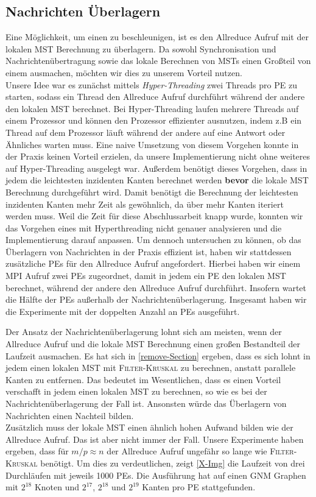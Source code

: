 \subsection{Nachrichten Überlagern}
Eine Möglichkeit, um einen \boruvkaStep zu beschleunigen, ist es den Allreduce Aufruf mit der lokalen MST Berechnung zu überlagern. Da sowohl Synchronisation und Nachrichtenübertragung sowie das lokale Berechnen von MSTs einen Großteil von einem \boruvkaStep ausmachen, möchten wir dies zu unserem Vorteil nutzen.\\
Unsere Idee war es zunächst mittels \emph{Hyper-Threading} zwei Threads pro PE zu starten, sodass ein Thread den Allreduce Aufruf durchführt während der andere den lokalen MST berechnet. Bei Hyper-Threading laufen mehrere Threads auf einem Prozessor und können den Prozessor effizienter ausnutzen, indem z.B ein Thread auf dem Prozessor läuft während der andere auf eine Antwort oder Ähnliches warten muss.
Eine naive Umsetzung von diesem Vorgehen konnte in der Praxis keinen Vorteil erzielen, da unsere Implementierung nicht ohne weiteres auf Hyper-Threading ausgelegt war. Außerdem benötigt dieses Vorgehen, dass in jedem \boruvkaStep die leichtesten inzidenten Kanten berechnet werden \textbf{bevor} die lokale MST Berechnung durchgeführt wird. Damit benötigt die Berechnung der leichtesten inzidenten Kanten mehr Zeit als gewöhnlich, da über mehr Kanten iteriert werden muss.
Weil die Zeit für diese Abschlussarbeit knapp wurde, konnten wir das Vorgehen eines \boruvkaStep mit Hyperthreading nicht genauer  analysieren und die Implementierung darauf anpassen. Um dennoch untersuchen zu können, ob das Überlagern von Nachrichten in der Praxis effizient ist, haben wir stattdessen zusätzliche PEs für den Allreduce Aufruf angefordert. Hierbei haben wir einem MPI Aufruf zwei PEs zugeordnet, damit in jedem \boruvkaStep ein PE den lokalen MST berechnet, während der andere den Allreduce Aufruf durchführt. Insofern wartet die Hälfte der PEs außerhalb der Nachrichtenüberlagerung.
Insgesamt haben wir die Experimente mit der doppelten Anzahl an PEs ausgeführt.

Der Ansatz der Nachrichtenüberlagerung lohnt sich am meisten, wenn der Allreduce Aufruf und die lokale MST Berechnung einen großen Bestandteil der Laufzeit ausmachen.
Es hat sich in \cref{remove-Section} ergeben, dass es sich lohnt in jedem \boruvkaStep einen lokalen MST mit \textsc{Filter-Kruskal} zu berechnen, anstatt parallele Kanten zu entfernen. Das bedeutet im Wesentlichen, dass es einen Vorteil verschafft in jedem \boruvkaStep einen lokalen MST zu berechnen, so wie es bei der Nachrichtenüberlagerung der Fall ist. Ansonsten würde das Überlagern von Nachrichten einen Nachteil bilden.\\
Zusätzlich muss der lokale MST einen ähnlich hohen Aufwand bilden wie der Allreduce Aufruf. Das ist aber nicht immer der Fall. Unsere Experimente haben ergeben, dass für $m/p \approx n$ der Allreduce Aufruf ungefähr so lange wie \textsc{Filter-Kruskal} benötigt. Um dies zu verdeutlichen, zeigt \cref{X-Img} die Laufzeit von drei \boruvkaAllreduce Durchläufen mit jeweils 1000 PEs. Die Ausführung hat auf einen GNM Graphen mit $2^{18}$ Knoten und $2^{17}$, $2^{18}$ und $2^{19}$ Kanten pro PE stattgefunden.



